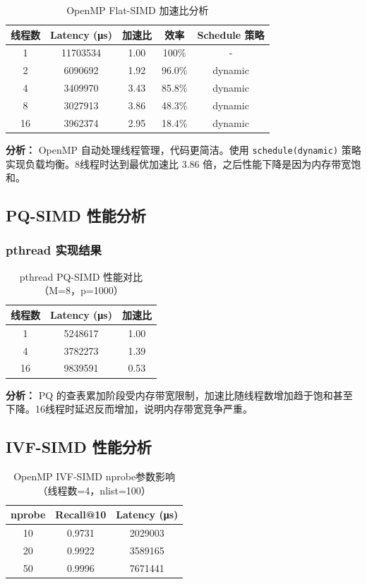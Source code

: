\documentclass[a4paper]{article}
\begin{document}
\begin{table}[htbp]
\centering
\caption{OpenMP Flat-SIMD 加速比分析}
\begin{tabular}{ccccc}
\toprule
线程数 & Latency (μs) & 加速比 & 效率 & Schedule 策略 \\
\midrule
1 & 11703534 & 1.00 & 100\% & - \\
2 & 6090692 & 1.92 & 96.0\% & dynamic \\
4 & 3409970 & 3.43 & 85.8\% & dynamic \\
8 & 3027913 & 3.86 & 48.3\% & dynamic \\
16 & 3962374 & 2.95 & 18.4\% & dynamic \\
\bottomrule
\end{tabular}
\end{table}

\textbf{分析：} OpenMP 自动处理线程管理，代码更简洁。使用 \texttt{schedule(dynamic)} 策略实现负载均衡。8线程时达到最优加速比 3.86 倍，之后性能下降是因为内存带宽饱和。

\subsection{PQ-SIMD 性能分析}

\subsubsection{pthread 实现结果}

\begin{table}[htbp]
\centering
\caption{pthread PQ-SIMD 性能对比（M=8，p=1000）}
\begin{tabular}{ccc}
\toprule
线程数 & Latency (μs) & 加速比 \\
\midrule
1 & 5248617 & 1.00 \\
4 & 3782273 & 1.39 \\
16 & 9839591 & 0.53 \\
\bottomrule
\end{tabular}
\end{table}

\textbf{分析：} PQ 的查表累加阶段受内存带宽限制，加速比随线程数增加趋于饱和甚至下降。16线程时延迟反而增加，说明内存带宽竞争严重。

\subsection{IVF-SIMD 性能分析}

\begin{table}[htbp]
\centering
\caption{OpenMP IVF-SIMD nprobe参数影响（线程数=4，nlist=100）}
\begin{tabular}{ccc}
\toprule
nprobe & Recall@10 & Latency (μs) \\
\midrule
10 & 0.9731 & 2029003 \\
20 & 0.9922 & 3589165 \\
50 & 0.9996 & 7671441 \\
\bottomrule
\end{tabular}
\end{table}
\end{document}
